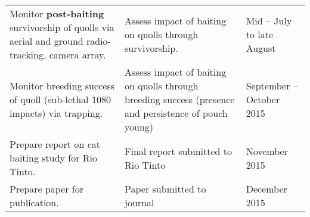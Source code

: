 \documentclass[version=last,
    paper=a4,                               %
    10pt,                                   %
    dvipsnames,
    oneside,                              %
    headings=openany,                       %
    open=any,
    BCOR=7mm,                               %
    DIV=15,     %
]{scrbook}
\begin{document}
\begin{longtable}[]{@{}lll@{}}
\begin{minipage}[t]{0.30\columnwidth}\raggedright
Monitor \textbf{post-baiting} survivorship of quolls via aerial and
ground radio-tracking, camera array.\strut
\end{minipage} & \begin{minipage}[t]{0.30\columnwidth}\raggedright
Assess impact of baiting on quolls through survivorship.\strut
\end{minipage} & \begin{minipage}[t]{0.30\columnwidth}\raggedright
Mid -- July to late August\strut
\end{minipage}\tabularnewline
\begin{minipage}[t]{0.30\columnwidth}\raggedright
Monitor breeding success of quoll (sub-lethal 1080 impacts) via
trapping.\strut
\end{minipage} & \begin{minipage}[t]{0.30\columnwidth}\raggedright
Assess impact of baiting on quolls through breeding success (presence
and persistence of pouch young)\strut
\end{minipage} & \begin{minipage}[t]{0.30\columnwidth}\raggedright
September -- October 2015\strut
\end{minipage}\tabularnewline
\begin{minipage}[t]{0.30\columnwidth}\raggedright
Prepare report on cat baiting study for Rio Tinto.\strut
\end{minipage} & \begin{minipage}[t]{0.30\columnwidth}\raggedright
Final report submitted to Rio Tinto\strut
\end{minipage} & \begin{minipage}[t]{0.30\columnwidth}\raggedright
November 2015\strut
\end{minipage}\tabularnewline
\begin{minipage}[t]{0.30\columnwidth}\raggedright
Prepare paper for publication.\strut
\end{minipage} & \begin{minipage}[t]{0.30\columnwidth}\raggedright
Paper submitted to journal\strut
\end{minipage} & \begin{minipage}[t]{0.30\columnwidth}\raggedright
December 2015\strut
\end{minipage}\tabularnewline
\bottomrule
\end{longtable}
\end{document}

